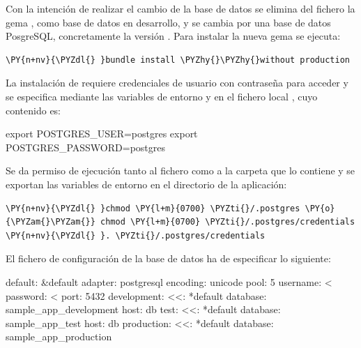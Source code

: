 Con la intención de realizar el cambio de la base de datos se elimina del fichero  la gema , como base de datos en desarrollo, y se cambia por una base de datos PosgreSQL, concretamente la versión . Para instalar la nueva gema se ejecuta:

\begin{framed_shaded}
\begin{Verbatim}[fontsize=\relsize{-2.5},fontseries=b,commandchars=\\\{\}]
\PY{n+nv}{\PYZdl{} }bundle install \PYZhy{}\PYZhy{}without production
\end{Verbatim}
\end{framed_shaded}

La instalación de  requiere credenciales de usuario con contraseña para acceder y se especifica mediante las variables de entorno  y  en el fichero local , cuyo contenido es:

\begin{codelisting}
\label{code:credentials}
\begin{code}
export POSTGRES_USER=postgres
export POSTGRES_PASSWORD=postgres
\end{code}
\end{codelisting}

Se da permiso de ejecución tanto al fichero como a la carpeta que lo contiene y se exportan las variables de entorno en el directorio de la aplicación:

\begin{framed_shaded}
\begin{Verbatim}[fontsize=\relsize{-2.5},fontseries=b,commandchars=\\\{\}]
\PY{n+nv}{\PYZdl{} }chmod \PY{l+m}{0700} \PYZti{}/.postgres \PY{o}{\PYZam{}\PYZam{}} chmod \PY{l+m}{0700} \PYZti{}/.postgres/credentials
\PY{n+nv}{\PYZdl{} }. \PYZti{}/.postgres/credentials
\end{Verbatim}
\end{framed_shaded}

El fichero de configuración de la base de datos ha de especificar lo siguiente:

\begin{codelisting}
\label{code:database}
\begin{code}
default: &default
  adapter: postgresql
  encoding: unicode
  pool: 5
  username: <%
  password: <%
  port: 5432
development:
  <<: *default
  database: sample_app_development  
  host: db
test:
  <<: *default
  database: sample_app_test
  host: db
production:
  <<: *default
  database: sample_app_production
\end{code}
\end{codelisting}

